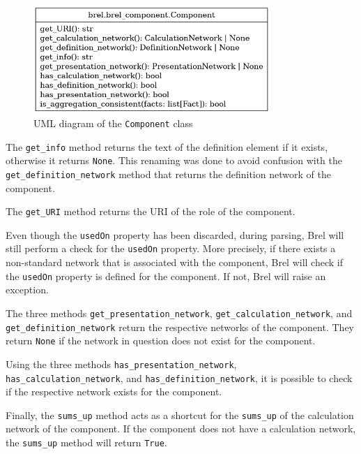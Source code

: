\begin{figure}[H]
  \caption{UML diagram of the \texttt{Component} class}
  \label{fig:uml_component}
  \centering
  \includegraphics[width=0.8\textwidth]{images/brel.brel_component.Component.png}
\end{figure}

The \texttt{get\_info} method returns the text of the definition element if it exists, otherwise it returns \texttt{None}.
This renaming was done to avoid confusion with the \texttt{get\_definition\_network} method that returns the definition network of the component.

The \texttt{get\_URI} method returns the URI of the role of the component.

Even though the \texttt{usedOn} property has been discarded, during parsing, Brel will still perform a check for the \texttt{usedOn} property.
More precisely, if there exists a non-standard network that is associated with the component, Brel will check if the \texttt{usedOn} property is defined for the component.
If not, Brel will raise an exception.

The three methods \texttt{get\_presentation\_network}, \texttt{get\_calculation\_network}, and \texttt{get\_definition\_network} return the respective networks of the component.
They return \texttt{None} if the network in question does not exist for the component.

Using the three methods \texttt{has\_presentation\_network}, \texttt{has\_calculation\_network}, and \texttt{has\_definition\_network}, it is possible to check if the respective network exists for the component.

Finally, the \texttt{sums\_up} method acts as a shortcut for the \texttt{sums\_up} of the calculation network of the component.
If the component does not have a calculation network, the \texttt{sums\_up} method will return \texttt{True}.


